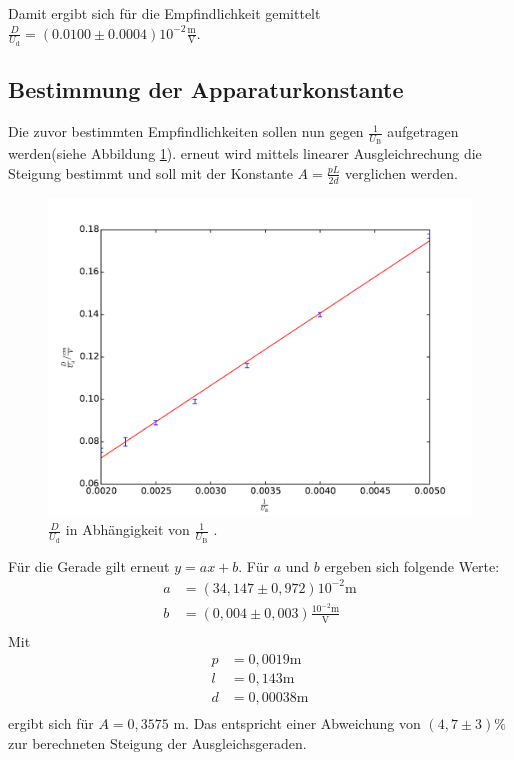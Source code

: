Damit ergibt sich für die Empfindlichkeit gemittelt $\frac{D}{U_\mathrm{d}}=(0.0100 \pm 0.0004)10^{-2}\frac{\si{\meter}}{\si{\volt}}$.

\subsection{Bestimmung der Apparaturkonstante}
Die zuvor bestimmten Empfindlichkeiten sollen nun gegen $\frac{1}{U_\mathrm{B}}$ aufgetragen werden(siehe Abbildung \ref{fig:A}). erneut wird mittels linearer Ausgleichrechung die Steigung bestimmt und soll mit der Konstante $A=\frac{pL}{2d}$ verglichen werden.

\begin{figure}
  \centering
  \includegraphics[scale=0.8]{auswertung/501-a3.pdf}
\caption{$\frac{D}{U_\mathrm{d}}$ in Abhängigkeit von $\frac{1}{U_\mathrm{B}}$ .}
  \label{fig:A}
\end{figure}

Für die Gerade gilt erneut $y=ax+b$. Für $a$ und $b$ ergeben sich folgende Werte:
\begin{align}
  a&=(34,147 \pm 0,972)10^{-2}\si{\meter}\\
  b&=(0,004 \pm 0,003)\frac{10^{-2}\si{\meter}}{\si{\volt}}\\
\end{align}
Mit
\begin{align}
  p&=0,0019 \si{\meter}\\
  l&=0,143 \si{\meter} \\
  d&=0,00038 \si{\meter}\\
\end{align}
ergibt sich für $A=0,3575$ \si{\meter}. Das entspricht einer Abweichung von $(4,7 \pm 3)\%$ zur berechneten Steigung der Ausgleichsgeraden.

